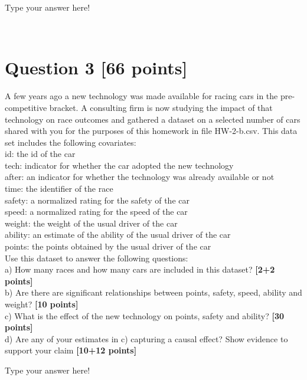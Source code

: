 \documentclass{article}
\begin{document}
\vspace{1cm}

{\color{blue}

Type your answer here!
}\\

\section*{\color{black} Question 3 {\bf [66 points]}}

A few years ago a new technology was made available for racing cars in the pre-competitive bracket. A consulting firm is now studying the impact of that technology on race outcomes and gathered a dataset on a selected number of cars shared with you for the purposes of this homework in file HW-2-b.csv. This data set includes the following covariates:\\

id: the id of the car\\

tech: indicator for whether the car adopted the new technology\\

after: an indicator for whether the technology was already available or not\\

time: the identifier of the race\\

safety: a normalized rating for the safety of the car\\

speed: a normalized rating for the speed of the car\\

weight: the weight of the usual driver of the car\\

ability: an estimate of the ability of the usual driver of the car\\

points: the points obtained by the usual driver of the car\\

Use this dataset to answer the following questions:\\

a) How many races and how many cars are included in this dataset? {\bf [2+2 points]}\\

b) Are there are significant relationships between points, safety, speed, ability and weight? {\bf [10 points]}\\

c) What is the effect of the new technology on points, safety and ability? {\bf [30 points]}\\

d) Are any of your estimates in c) capturing a causal effect? Show evidence to support your claim {\bf [10+12 points]}\\ 

\vspace{1cm}

{\color{blue}

Type your answer here!
}\\
\end{document}
